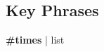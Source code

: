 \subsection{Key Phrases} %
	\label{FIRE-PHRASES}

	\begin{compactdesc}
		\item[lake of fire and brimstone] \textbf{\#times} | list
	\end{compactdesc}
	


	
		
	
	
